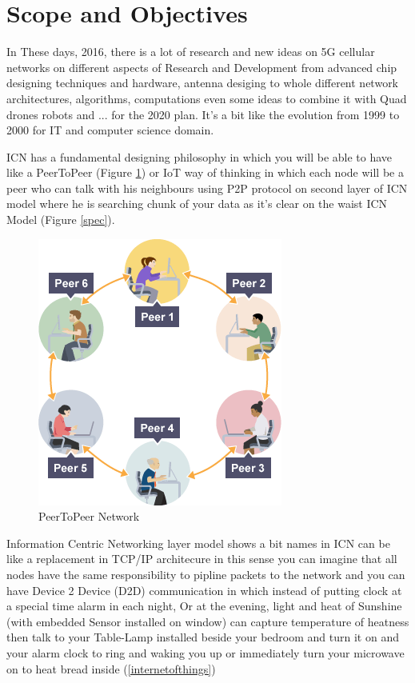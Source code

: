 \section{Scope and Objectives}
In These days, 2016,  there is a lot of research and new ideas on 5G cellular networks on different aspects of Research and Development from advanced chip designing techniques and hardware, antenna desiging to whole different network architectures, algorithms, computations even some ideas to combine it with Quad drones robots and ... for the 2020 plan. It's a bit like the evolution from 1999 to 2000 for IT and computer science domain.

ICN has a fundamental designing philosophy in which you will be able to have like a PeerToPeer (Figure \ref{peertopeer}) or IoT way of thinking in which each node will be a peer who can talk with his neighbours using P2P protocol on second layer of ICN model where he is searching chunk of your data as it's clear on the waist ICN Model (Figure \ref{spec}). 


\begin{figure}[H]

\begin{center}

\includegraphics[scale = 0.4]{Pictures/peertopeer.png}

\caption{PeerToPeer Network} \label{peertopeer} 

\end{center}

\end{figure}



Information Centric Networking layer model shows a bit names in ICN can be like a replacement in TCP/IP architecure in this sense you can imagine that all nodes have the same responsibility to pipline packets to the network and you can have Device 2 Device (D2D) communication in which instead of putting clock at a special time alarm in each night, Or at the evening, light and heat of Sunshine (with embedded Sensor installed on window) can capture temperature of heatness then talk to your Table-Lamp installed beside your bedroom and turn it on and your alarm clock to ring and waking you up or immediately turn your microwave on to heat bread inside (\ref{internetofthings})



